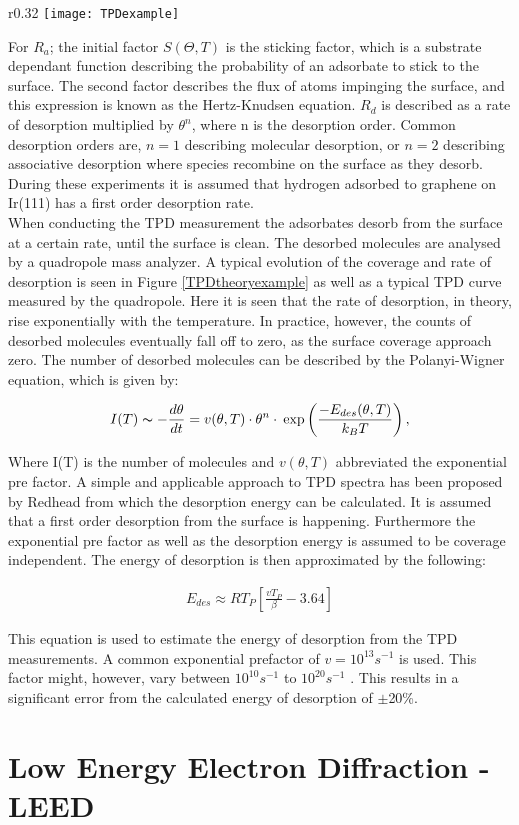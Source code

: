 \begin{wrapfigure}{r}{0.32\textwidth}
  \centering
  \texttt{[image: TPDexample]}
  \caption{ \cite{desorpslides}}
  \label{TPDtheoryexample}
\end{wrapfigure}
For $R_a$; the initial factor $S(\Theta ,T)$ is the sticking factor, which is a substrate dependant function describing the probability of an adsorbate to stick to the surface. The second factor describes the flux of atoms impinging the surface, and this expression is known as the Hertz-Knudsen equation. $R_d$ is described as a rate of desorption multiplied by $\theta^n$, where n is the desorption order. Common desorption orders are, $n = 1$ describing molecular desorption, or $n=2$ describing associative desorption where species recombine on the surface as they desorb. During these experiments it is assumed that hydrogen adsorbed to graphene on Ir(111) has a first order desorption rate.\\
When conducting the TPD measurement the adsorbates desorb from the surface at a certain rate, until the surface is clean. The desorbed molecules are analysed by a quadropole mass analyzer. A typical evolution of the coverage and rate of desorption is seen in Figure \ref{TPDtheoryexample} as well as a typical TPD curve measured by the quadropole. Here it is seen that the rate of desorption, in theory, rise exponentially with the temperature. In practice, however, the counts of desorbed molecules eventually fall off to zero, as the surface coverage approach zero. The number of desorbed molecules can be described by the Polanyi-Wigner equation, which is given by: \cite{TPDbog, TPDekstra}

\begin{align}
  I(T) \thicksim - \frac{d\theta}{dt} = v(\theta,T)\cdot \theta^n \cdot \: \text{exp}\left(\frac{-E_{des}(\theta,T)}{k_BT}\right),
\end{align}

Where I(T) is the number of molecules and $v(\theta,T)$ abbreviated the exponential pre factor. A simple and applicable approach to TPD spectra has been proposed by Redhead from which the desorption energy can be calculated.\cite{TPDbog} It is assumed that a first order desorption from the surface is happening. Furthermore the exponential pre factor as well as the desorption energy is assumed to be coverage independent. The energy of desorption is then approximated by the following:\cite{berlinslides}

\begin{align}
E_{des} \approx RT_P \left[ \frac{v T_P}{\beta} - 3.64 \right]
\label{eq:redhead}
\end{align}

This equation is used to estimate the energy of desorption from the TPD measurements. A common exponential prefactor of $v = 10^{13} s^{-1}$ is used. This factor might, however, vary between $10^{10} s^{-1}$ to $10^{20} s^{-1}$ \cite{TPDbog}. This results in a significant error from the calculated energy of desorption of $\pm$20\%.\cite{berlinslides}

\section{Low Energy Electron Diffraction - LEED}
